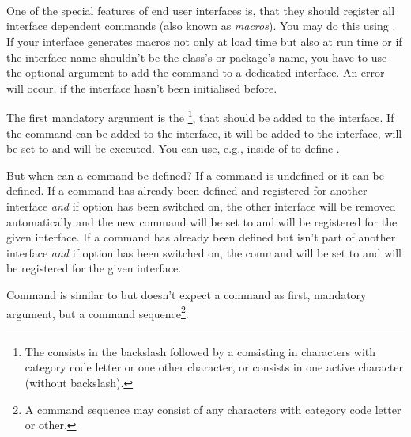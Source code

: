 \begin{Declaration}
  \\
  \\
  \\
\end{Declaration}
%
%
%
%
One of the special features of end user interfaces is, that they should
register all interface dependent commands (also known as \emph{macros}). You
may do this using %
. If your interface generates macros not only at load time but also at run
time or if the interface name shouldn't be the class's or package's name, you
have to use the optional argument to add the command to a dedicated
interface. An error will occur, if the interface hasn't been initialised
before.

The first mandatory argument is the \footnote{The
   consists in the backslash followed by a  consisting in characters with category code letter or one other
  character, or  consists in one active character (without
  backslash).}, that should be added to the interface. If the command can be
added to the interface, it will be added to the interface, will be set to
 and  will be executed. You can use, e.g.,
 inside of  to define
.

But when can a command be defined? If a command is undefined or 
it can be defined. If a command has already been defined and registered for
another interface \emph{and} if \KOMAScript{} option
 has been switched on, the other interface will be
removed automatically and the new command will be set to  and
will be registered for the given interface. If a command
has already been defined but isn't part of another interface \emph{and} if
\KOMAScript{} option  has been switched on, the command
will be set to  and will be registered for the given interface.

Command  is similar to
 but doesn't expect a command as first,
mandatory argument, but a command sequence\footnote{A command sequence may
  consist of any characters with category code letter or other.}.%
%
%
%

